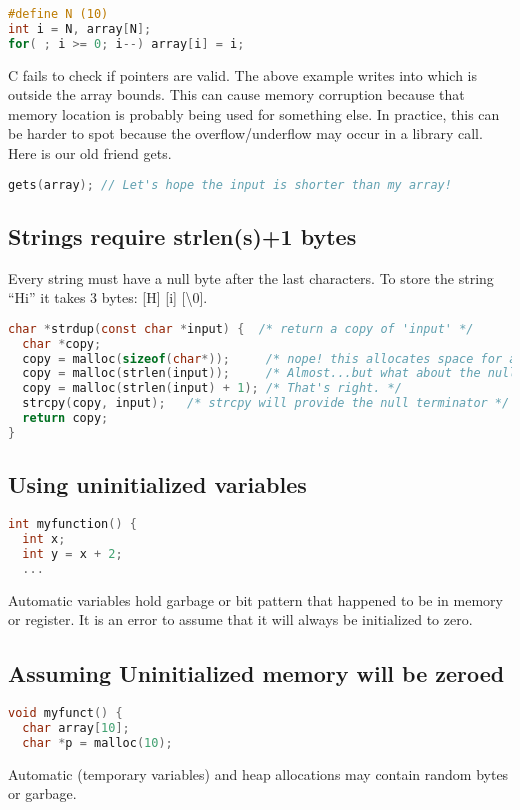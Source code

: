 \begin{lstlisting}[language=C]
#define N (10)
int i = N, array[N];
for( ; i >= 0; i--) array[i] = i;
\end{lstlisting}

C fails to check if pointers are valid.
The above example writes into  which is outside the array bounds.
This can cause memory corruption because that memory location is probably being used for something else.
In practice, this can be harder to spot because the overflow/underflow may occur in a library call.
Here is our old friend gets.

\begin{lstlisting}[language=C]
gets(array); // Let's hope the input is shorter than my array!
\end{lstlisting}


\subsection{Strings require strlen(s)+1 bytes}

Every string must have a null byte after the last characters.
To store the string ``Hi'' it takes 3 bytes: [H] [i] [\backslash 0].

\begin{lstlisting}[language=C]
char *strdup(const char *input) {  /* return a copy of 'input' */
  char *copy;
  copy = malloc(sizeof(char*));     /* nope! this allocates space for a pointer, not a string */
  copy = malloc(strlen(input));     /* Almost...but what about the null terminator? */
  copy = malloc(strlen(input) + 1); /* That's right. */
  strcpy(copy, input);   /* strcpy will provide the null terminator */
  return copy;
}
\end{lstlisting}

\subsection{Using uninitialized variables}

\begin{lstlisting}[language=C]
int myfunction() {
  int x;
  int y = x + 2;
  ...
\end{lstlisting}

Automatic variables hold garbage or bit pattern that happened to be in memory or register.
It is an error to assume that it will always be initialized to zero.

\subsection{Assuming Uninitialized memory will be zeroed}

\begin{lstlisting}[language=C]
void myfunct() {
  char array[10];
  char *p = malloc(10);
\end{lstlisting}

Automatic (temporary variables) and heap allocations may contain random bytes or garbage.
